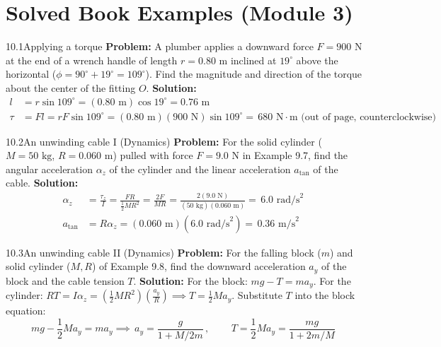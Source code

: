 \documentclass[11pt,a4paper,openany,oneside]{book}
\newcommand{\eqbox}[1]{\boxed{\,#1\,}}
\numberwithin{equation}{chapter}
\newcommand{\bk}[1]{\texorpdfstring{\enspace{\normalfont\small\color{slate}[Book #1]}}{ [Book #1]}}
\begin{document}
\section{Solved Book Examples (Module 3)}

\begin{example}{10.1}{Applying a torque\bk{p.\ 310}}
\textbf{Problem:} A plumber applies a downward force $F = 900\text{ N}$ at the end of a wrench handle of length $r = 0.80\text{ m}$ inclined at $19^\circ$ above the horizontal ($\phi = 90^\circ + 19^\circ = 109^\circ$). Find the magnitude and direction of the torque about the center of the fitting $O$.
\tcblower
\textbf{Solution:}
\begin{align*}
  l &= r\sin 109^\circ = (0.80\text{ m})\cos 19^\circ = 0.76\text{ m}\\
  \tau &= Fl = rF\sin 109^\circ = (0.80\text{ m})(900\text{ N})\sin 109^\circ = \eqbox{680\text{ N}\cdot\text{m}\text{ (out of page, counterclockwise)}}
\end{align*}
\end{example}

\begin{example}{10.2}{An unwinding cable I (Dynamics)\bk{p.\ 313}}
\textbf{Problem:} For the solid cylinder ($M = 50\text{ kg}$, $R = 0.060\text{ m}$) pulled with force $F = 9.0\text{ N}$ in Example 9.7, find the angular acceleration $\alpha_z$ of the cylinder and the linear acceleration $a_{\text{tan}}$ of the cable.
\tcblower
\textbf{Solution:}
\begin{align*}
  \alpha_z &= \frac{\tau_z}{I} = \frac{FR}{\frac{1}{2}MR^2} = \frac{2F}{MR} = \frac{2(9.0\text{ N})}{(50\text{ kg})(0.060\text{ m})} = \eqbox{6.0\text{ rad/s}^2}\\
  a_{\text{tan}} &= R\alpha_z = (0.060\text{ m})(6.0\text{ rad/s}^2) = \eqbox{0.36\text{ m/s}^2}
\end{align*}
\end{example}

\begin{example}{10.3}{An unwinding cable II (Dynamics)\bk{p.\ 314}}
\textbf{Problem:} For the falling block ($m$) and solid cylinder ($M, R$) of Example 9.8, find the downward acceleration $a_y$ of the block and the cable tension $T$.
\tcblower
\textbf{Solution:} For the block: $mg - T = ma_y$. For the cylinder: $RT = I\alpha_z = \left(\frac{1}{2}MR^2\right)\!\left(\frac{a_y}{R}\right) \implies T = \frac{1}{2}Ma_y$. Substitute $T$ into the block equation:
\begin{equation*}
  mg - \frac{1}{2}Ma_y = ma_y \implies \eqbox{a_y = \frac{g}{1 + M/2m}}, \qquad \eqbox{T = \frac{1}{2}Ma_y = \frac{mg}{1 + 2m/M}}
\end{equation*}
\end{example}
\end{document}

